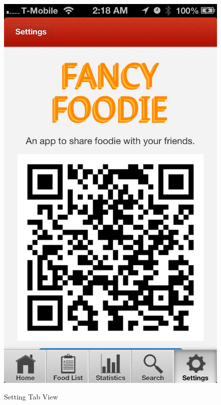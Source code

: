 \begin{figure}
{	\includegraphics[width=\figwidth, totalheight=\figheight, keepaspectratio]{./screenshots/settings-website.png}} \hfill
    \caption{Setting Tab View}
	\label{fig:settings}
\end{figure}

